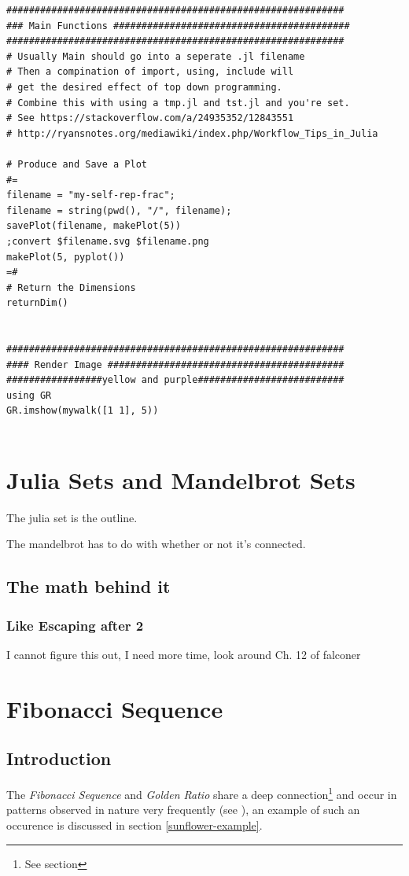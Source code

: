 \documentclass[11pt]{article}
\begin{document}
\begin{verbatim}
############################################################
### Main Functions ##########################################
############################################################
# Usually Main should go into a seperate .jl filename
# Then a compination of import, using, include will
# get the desired effect of top down programming.
# Combine this with using a tmp.jl and tst.jl and you're set.
# See https://stackoverflow.com/a/24935352/12843551
# http://ryansnotes.org/mediawiki/index.php/Workflow_Tips_in_Julia

# Produce and Save a Plot
#=
filename = "my-self-rep-frac";
filename = string(pwd(), "/", filename);
savePlot(filename, makePlot(5))
;convert $filename.svg $filename.png
makePlot(5, pyplot())
=#
# Return the Dimensions
returnDim()


############################################################
#### Render Image ##########################################
#################yellow and purple##########################
using GR
GR.imshow(mywalk([1 1], 5))


\end{verbatim}

\section{Julia Sets and Mandelbrot Sets}
\label{julia-set}
The julia set is the outline.

The mandelbrot has to do with whether or not it's connected.
\subsection{The math behind it}
\label{sec:orgabf3f7b}
\subsubsection{Like Escaping after 2}
\label{sec:org806bc0f}
I cannot figure this out, I need more time, look around Ch. 12 of falconer \cite{falconerFractalGeometryMathematical2003}
\section{Fibonacci Sequence}
\label{sec:org3dd4896}
\subsection{Introduction}
\label{sec:orga713e9c}
The \emph{Fibonacci Sequence} and \emph{Golden Ratio} share a deep connection\footnote{See section} and occur in patterns observed in nature very frequently
(see
\cite{shellyallenFibonacciNature,benedettapalazzoNumbersNatureFibonacci2016,MinarovaNikoletta2014TFSN,NatureGoldenRatio2018,robertlambHowAreFibonacci2008,ronknottFibonacciNumbersGolden2016}), an example of such an occurence is discussed in section \ref{sunflower-example}.
\end{document}
